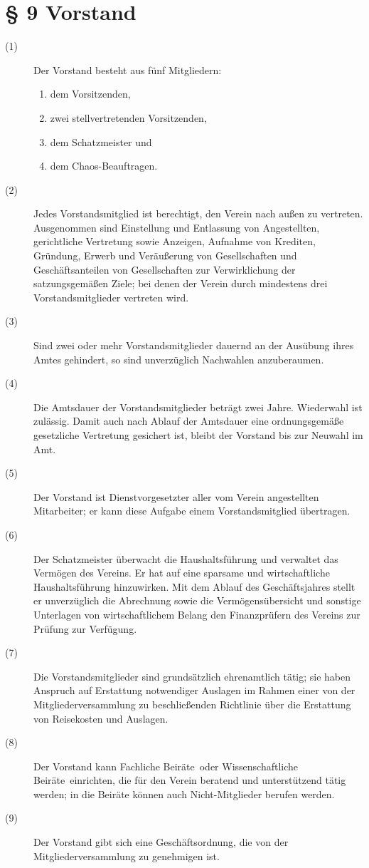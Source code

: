 \documentclass[12pt,paper=a4,ngerman]{scrreprt}
\begin{document}
\section{\S{} 9 Vorstand}
\begin{description}
\item[(1)]
Der Vorstand besteht aus fünf Mitgliedern:
\begin{enumerate}
\item
dem Vorsitzenden,
\item
zwei stellvertretenden Vorsitzenden,
\item
dem Schatzmeister und
\item
dem Chaos-Beauftragen.
\end{enumerate}
\item[(2)]
Jedes Vorstandsmitglied ist berechtigt, den Verein nach außen zu
vertreten. Ausgenommen sind Einstellung und Entlassung von
Angestellten, gerichtliche Vertretung sowie Anzeigen, Aufnahme von
Krediten, Gründung, Erwerb und Veräußerung von Gesellschaften und
Geschäftsanteilen von Gesellschaften zur Verwirklichung der
satzungsgemäßen Ziele; bei denen der Verein durch mindestens drei
Vorstandsmitglieder vertreten wird.
\item[(3)]
Sind zwei oder mehr Vorstandsmitglieder dauernd an der Ausübung ihres
Amtes gehindert, so sind unverzüglich Nachwahlen anzuberaumen.
\item[(4)]
Die Amtsdauer der Vorstandsmitglieder beträgt zwei Jahre. Wiederwahl
ist zulässig. Damit auch nach Ablauf der Amtsdauer eine ordnungsgemäße
gesetzliche Vertretung gesichert ist, bleibt der Vorstand bis zur
Neuwahl im Amt.
\item[(5)]
Der Vorstand ist Dienstvorgesetzter aller vom Verein angestellten
Mitarbeiter; er kann diese Aufgabe einem Vorstandsmitglied
übertragen.
\item[(6)]
Der Schatzmeister überwacht die Haushaltsführung und verwaltet das
Vermögen des Vereins. Er hat auf eine sparsame und wirtschaftliche
Haushaltsführung hinzuwirken. Mit dem Ablauf des Geschäftsjahres
stellt er unverzüglich die Abrechnung sowie die Vermögensübersicht und
sonstige Unterlagen von wirtschaftlichem Belang den Finanzprüfern des
Vereins zur Prüfung zur Verfügung.
\item[(7)]
Die Vorstandsmitglieder sind grundsätzlich ehrenamtlich tätig; sie
haben Anspruch auf Erstattung notwendiger Auslagen im Rahmen einer von
der Mitgliederversammlung zu beschließenden Richtlinie über die
Erstattung von Reisekosten und Auslagen.
\item[(8)]
Der Vorstand kann \glqq Fachliche Beiräte\grqq\ oder \glqq
Wissenschaftliche Beiräte\grqq\ einrichten, die für den Verein
beratend und unterstützend tätig werden; in die Beiräte können auch
Nicht-Mitglieder berufen werden.
\item[(9)]
Der Vorstand gibt sich eine Geschäftsordnung, die von der
Mitgliederversammlung zu genehmigen ist.
\end{description}
\end{document}
